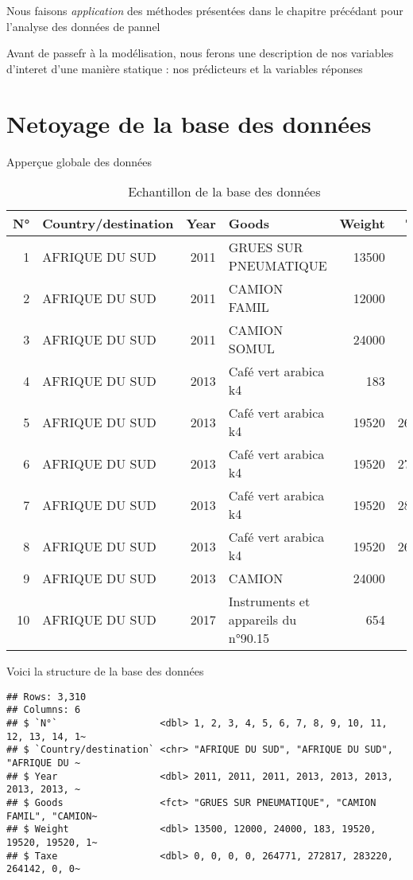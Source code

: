\documentclass[
]{book}
\begin{document}
Nous faisons \emph{application} des méthodes présentées dans le chapitre précédant pour l'analyse des données de pannel

Avant de passefr à la modélisation, nous ferons une description de nos variables d'interet d'une manière statique : nos prédicteurs et la variables réponses

\hypertarget{netoyage-de-la-base-des-donnuxe9es}{%
\section{Netoyage de la base des données}\label{netoyage-de-la-base-des-donnuxe9es}}

Apperçue globale des données

\begin{table}

\caption{\label{tab:unnamed-chunk-2}Echantillon de la base des données}
\centering
\begin{tabular}[t]{r|l|r|l|r|r}
\hline
N° & Country/destination & Year & Goods & Weight & Taxe\\
\hline
1 & AFRIQUE DU SUD & 2011 & GRUES SUR PNEUMATIQUE & 13500 & 0\\
\hline
2 & AFRIQUE DU SUD & 2011 & CAMION FAMIL & 12000 & 0\\
\hline
3 & AFRIQUE DU SUD & 2011 & CAMION SOMUL & 24000 & 0\\
\hline
4 & AFRIQUE DU SUD & 2013 & Café vert arabica k4 & 183 & 0\\
\hline
5 & AFRIQUE DU SUD & 2013 & Café vert arabica k4 & 19520 & 264771\\
\hline
6 & AFRIQUE DU SUD & 2013 & Café vert arabica k4 & 19520 & 272817\\
\hline
7 & AFRIQUE DU SUD & 2013 & Café vert arabica k4 & 19520 & 283220\\
\hline
8 & AFRIQUE DU SUD & 2013 & Café vert arabica k4 & 19520 & 264142\\
\hline
9 & AFRIQUE DU SUD & 2013 & CAMION & 24000 & 0\\
\hline
10 & AFRIQUE DU SUD & 2017 & Instruments et appareils du n°90.15 & 654 & 0\\
\hline
\end{tabular}
\end{table}

Voici la structure de la base des données

\begin{verbatim}
## Rows: 3,310
## Columns: 6
## $ `N°`                  <dbl> 1, 2, 3, 4, 5, 6, 7, 8, 9, 10, 11, 12, 13, 14, 1~
## $ `Country/destination` <chr> "AFRIQUE DU SUD", "AFRIQUE DU SUD", "AFRIQUE DU ~
## $ Year                  <dbl> 2011, 2011, 2011, 2013, 2013, 2013, 2013, 2013, ~
## $ Goods                 <fct> "GRUES SUR PNEUMATIQUE", "CAMION FAMIL", "CAMION~
## $ Weight                <dbl> 13500, 12000, 24000, 183, 19520, 19520, 19520, 1~
## $ Taxe                  <dbl> 0, 0, 0, 0, 264771, 272817, 283220, 264142, 0, 0~
\end{verbatim}
\end{document}
